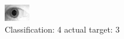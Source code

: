 \begin{figure}[h!]
\begin{center}
\includegraphics[width=0.60\columnwidth]{figures/ID1802_class_4_target_3.png}
\end{center}
\caption{ Classification: 4 actual target: 3}
\label{fig:ID1802_class_4_target_3}
\end{figure}
